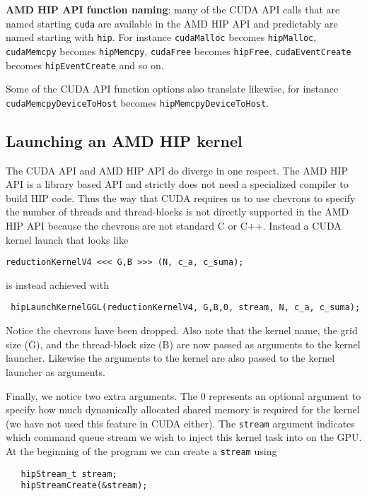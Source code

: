 {\bf AMD HIP API function naming}: many of the CUDA API calls that are named starting \texttt{cuda} are available in the AMD HIP API and predictably are named starting with \texttt{hip}.  For instance \texttt{cudaMalloc} becomes \texttt{hipMalloc}, \texttt{cudaMemcpy} becomes \texttt{hipMemcpy}, \texttt{cudaFree} becomes \texttt{hipFree}, \texttt{cudaEventCreate} becomes \texttt{hipEventCreate} and so on. 

Some of the CUDA API function options also translate likewise, for instance \texttt{cudaMemcpyDeviceToHost} becomes \texttt{hipMemcpyDeviceToHost}. 

\subsection{Launching an AMD HIP kernel}

The CUDA API and AMD HIP API do diverge in one respect. The AMD HIP API is a library based API and strictly does not need a specialized compiler to build HIP code. Thus the way that CUDA requires us to use chevrons to specify the number of threads and thread-blocks is not directly supported in the AMD HIP API because the chevrons are not standard C or C++. Instead a CUDA kernel launch that looks like

\begin{verbatim}
reductionKernelV4 <<< G,B >>> (N, c_a, c_suma);
\end{verbatim}

is instead achieved with

\begin{verbatim}
 hipLaunchKernelGGL(reductionKernelV4, G,B,0, stream, N, c_a, c_suma);
\end{verbatim}

Notice the chevrons have been dropped. Also note that the kernel name, the grid size (G), and the thread-block size (B) are now passed as arguments to the kernel launcher. Likewise the arguments to the kernel are also passed to the kernel launcher as arguments.

Finally, we notice two extra arguments. The 0 represents an optional argument to specify how much dynamically allocated shared memory is required for the kernel (we have not used this feature in CUDA either). The \texttt{stream} argument indicates which command queue stream we wish to inject this kernel task into on the GPU. At the beginning of the program we can create a \texttt{stream} using

\begin{verbatim}
   hipStream_t stream;
   hipStreamCreate(&stream);
\end{verbatim}

